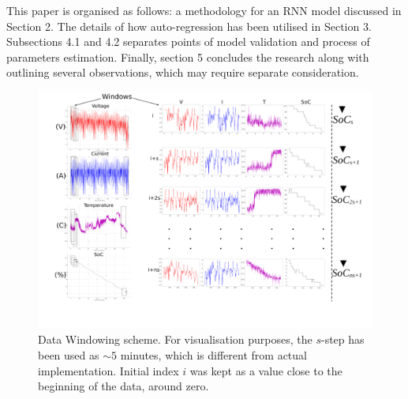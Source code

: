 %
%
This paper is organised as follows: a methodology for an RNN model discussed in Section 2.
The details of how auto-regression has been utilised in Section 3.
Subsections 4.1 and 4.2 separates points of model validation and process of parameters estimation.
Finally, section 5 concludes the research along with outlining several observations, which may require separate consideration.
\begin{landscape}
    \begin{figure}[ht]
        \centering
        \includegraphics[width=0.9\linewidth]{II_Body/images/Windowing4f-A3.jpg}
        \caption{Data Windowing scheme. For visualisation purposes, the $s$-step has been used as $\sim 5$ minutes, which is different from actual implementation. Initial index $i$ was kept as a value close to the beginning of the data, around zero.}
        \label{fig:Windowing}
    \end{figure}
\end{landscape}